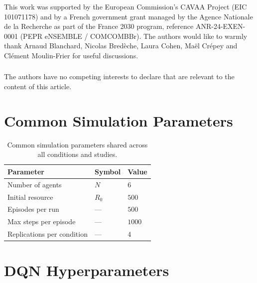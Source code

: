 \documentclass[runningheads]{llncs}
\begin{document}
\begin{credits}
\subsubsection{\ackname} This work was supported by the European Commission's CAVAA Project (EIC 101071178) and by a French government grant managed by the Agence Nationale de la Recherche as part of the France 2030 program, reference ANR-24-EXEN-0001 (PEPR eNSEMBLE / COMCOMBBr). The authors would like to warmly thank Arnaud Blanchard, Nicolas Bredèche, Laura Cohen, Maël Crépey and Clément Moulin-Frier for useful discussions.

\subsubsection{\discintname} The authors have no competing interests to declare that are relevant to the content of this article.
\end{credits}

\newpage
\appendix

\section{Common Simulation Parameters}
\label{app:simparams}

\begin{table}[h]
\centering
\begin{tabular}{lll}
\hline
\textbf{Parameter} & \textbf{Symbol} & \textbf{Value} \\
\hline
Number of agents      & $N$     & $6$    \\
Initial resource      & $R_0$   & $500$  \\
Episodes per run      & ---     & $500$  \\
Max steps per episode & ---     & $1000$ \\
Replications per condition & --- & $4$  \\
\hline
\end{tabular}
\caption{Common simulation parameters shared across all conditions and studies.}
\label{tab:simparams}
\end{table}

\section{DQN Hyperparameters}
\label{app:hyperparams}
\end{document}

